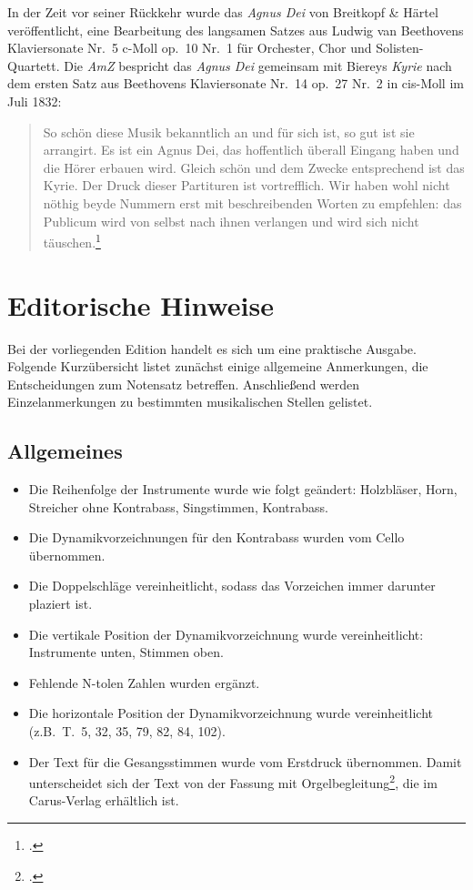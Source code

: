 \documentclass[paper=A3,12pt]{scrartcl}
\begin{document}
In der Zeit vor seiner Rückkehr wurde das \textit{Agnus Dei} von Breitkopf \& Härtel veröffentlicht, eine Bearbeitung des langsamen Satzes aus Ludwig van Beethovens Klaviersonate Nr.~5 c-Moll op.~10 Nr.~1 für Orchester, Chor und Solisten-Quartett. %
Die \textit{AmZ} bespricht das \textit{Agnus Dei} gemeinsam mit Biereys \textit{Kyrie} nach dem ersten Satz aus Beethovens Klaviersonate Nr.~14 op.~27 Nr.~2 in cis-Moll im Juli 1832:

\begin{quote}
  So schön diese Musik bekanntlich an und für sich ist, so gut ist sie arrangirt.
  Es ist ein Agnus Dei, das hoffentlich überall Eingang haben und die Hörer erbauen wird.
  Gleich schön und dem Zwecke entsprechend ist das Kyrie.
  Der Druck dieser Partituren ist vortrefflich.
  Wir haben wohl nicht nöthig beyde Nummern erst mit beschreibenden Worten zu empfehlen:
  das Publicum wird von selbst nach ihnen verlangen und wird sich nicht täuschen.\footcite{1832_NA_Rezension_AMZ}
\end{quote}


\section{Editorische Hinweise}

Bei der vorliegenden Edition handelt es sich um eine praktische Ausgabe.
Folgende Kurzübersicht listet zunächst einige allgemeine Anmerkungen, die Entscheidungen zum Notensatz betreffen.
Anschließend werden Einzelanmerkungen zu bestimmten musikalischen Stellen gelistet.

\subsection{Allgemeines}

\begin{itemize}
  \setlength\itemsep{0.0\baselineskip}
  \item Die Reihenfolge der Instrumente wurde wie folgt geändert: Holzbläser, Horn, Streicher ohne Kontrabass, Singstimmen, Kontrabass.
  \item Die Dynamikvorzeichnungen für den Kontrabass wurden vom Cello übernommen.
  \item Die Doppelschläge vereinheitlicht, sodass das Vorzeichen immer darunter plaziert ist.
  \item Die vertikale Position der Dynamikvorzeichnung wurde vereinheitlicht: Instrumente unten, Stimmen oben.
  \item Fehlende N-tolen Zahlen wurden ergänzt.
  \item Die horizontale Position der Dynamikvorzeichnung wurde vereinheitlicht (z.B.\ T.\ 5, 32, 35, 79, 82, 84, 102).
  \item Der Text für die Gesangsstimmen wurde vom Erstdruck übernommen. Damit unterscheidet sich der Text von der Fassung mit Orgelbegleitung\footcite{2018_Schumacher_AgnusDei_Carus}, die im Carus-Verlag erhältlich ist.
\end{itemize}
\end{document}
